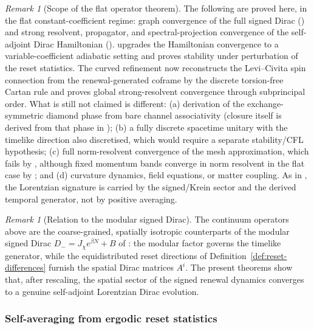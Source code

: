\documentclass[11pt]{article}
\theoremstyle{definition}
\theoremstyle{remark}
\newtheorem{remark}[theorem]{Remark}
\begin{document}
\begin{remark}[Scope of the flat operator theorem]
\label{rem:operator-scope}
The following are proved here, in the flat constant-coefficient regime:
graph convergence of the full signed Dirac () and strong
resolvent, propagator, and spectral-projection convergence of the self-adjoint
Dirac Hamiltonian ().  
upgrades the Hamiltonian convergence to a variable-coefficient adiabatic setting
and proves stability under perturbation of the reset statistics.  The curved refinement now reconstructs the
Levi--Civita spin connection from the renewal-generated coframe by the discrete
torsion-free Cartan rule and proves global strong-resolvent convergence through
subprincipal order.  What is still not claimed is different:
\textup{(a)} derivation of the exchange-symmetric diamond phase from bare channel associativity \textup{(}closure itself is derived from that phase in \textup{)}; \textup{(b)} a fully discrete spacetime unitary with the timelike
direction also discretised, which would require a separate stability/CFL
hypothesis; \textup{(c)} full norm-resolvent convergence of the mesh
approximation, which fails by , although fixed
momentum bands converge in norm resolvent in the flat case by
; and \textup{(d)} curvature dynamics, field
equations, or matter coupling.  As in
, the Lorentzian signature is carried by the signed/Krein sector and the derived temporal generator, not by positive averaging.
\end{remark}

\begin{remark}[Relation to the modular signed Dirac]
\label{rem:modular-relation}
The continuum operators above are the coarse-grained, spatially isotropic
counterparts of the modular signed Dirac $D_-=J_\chi e^{\beta N}+B$ of
: the modular factor governs the timelike generator, while
the equidistributed reset directions of Definition~\ref{def:reset-differences} furnish the
spatial Dirac matrices $A^i$.  The present theorems show that, after rescaling,
the spatial sector of the signed renewal dynamics converges to a genuine
self-adjoint Lorentzian Dirac evolution.
\end{remark}

\subsubsection{Self-averaging from ergodic reset statistics}
\label{subsec:self-averaging}
\end{document}
